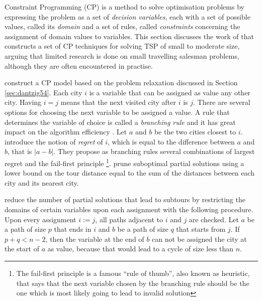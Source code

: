 \documentclass[a4paper,12pt]{article}
\begin{document}
Constraint Programming (CP) is a method to solve optimisation problems by expressing the problem as a set of \textit{decision variables}, each with a set of possible values, called its \textit{domain} and a set of rules, called \textit{constraints} concerning the assignment of domain values to variables. This section discusses the work of \citet{Caseau97} that constructs a set of CP techniques for solving TSP of small to moderate size, arguing that limited research is done on small travelling salesman problems, although they are often encountered in practise.

\citet{Caseau97} construct a CP model based on the problem relaxation discussed in Section \ref{sec:dantzig54}. Each city $i$ is a variable that can be assigned as value any other city. Having $i = j$ means that the next visited city after $i$ is $j$.
There are several options for choosing the next variable to be assigned a value. A rule that determines the variable of choice is called a \textit{branching rule} and it has great impact on the algorithm efficiency \citep{Christopher03, Gent96}. Let $a$ and $b$ be the two cities closest to $i$. \citet{Caseau97} introduce the notion of \textit{regret} of $i$, which is equal to the difference between $a$ and $b$, that is $|a - b|$. They propose as branching rules several combinations of largest regret and the fail-first principle \citep{Haralick80} \footnote{The fail-first principle is a famous ``rule of thumb'', also known as heuristic, that says that the next variable chosen by the branching rule should be the one which is most likely going to lead to invalid solution}.
\citet{Caseau97} prune suboptimal partial solutions using a lower bound on the tour distance equal to the sum of the distances between each city and its nearest city. %

\citet{Caseau97} reduce the number of partial solutions that lead to subtours by restricting the domains of certain variables upon each assignment with the following procedure. Upon every assignment $i := j$, all paths adjacent to $i$ and $j$ are checked. Let $a$ be a path of size $p$ that ends in $i$ and $b$ be a path of size $q$ that starts from $j$. If $p + q < n-2$, then the variable at the end of $b$ can not be assigned the city at the start of $a$ as value, because that would lead to a cycle of size less than $n$. 
\end{document}

